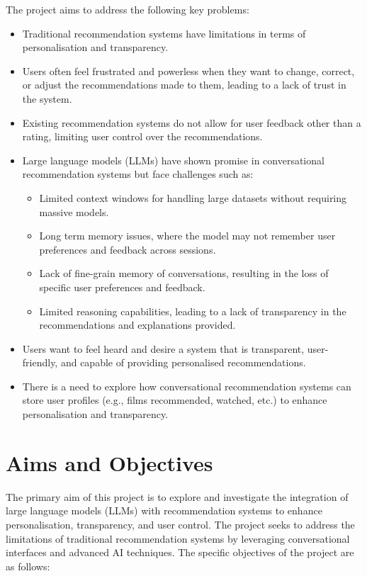 The project aims to address the following key problems:

\begin{itemize}
    \item Traditional recommendation systems have limitations in terms of personalisation and transparency.
    \item Users often feel frustrated and powerless when they want to change, correct, or adjust the recommendations made to them, leading to a lack of trust in the system.
    \item Existing recommendation systems do not allow for user feedback other than a rating, limiting user control over the recommendations.
    \item Large language models (LLMs) have shown promise in conversational recommendation systems but face challenges such as:
    \begin{itemize}
        \item Limited context windows for handling large datasets without requiring massive models.
        \item Long term memory issues, where the model may not remember user preferences and feedback across sessions.
        \item Lack of fine-grain memory of conversations, resulting in the loss of specific user preferences and feedback.
        \item Limited reasoning capabilities, leading to a lack of transparency in the recommendations and explanations provided.
    \end{itemize}
    \item Users want to feel heard and desire a system that is transparent, user-friendly, and capable of providing personalised recommendations.
    \item There is a need to explore how conversational recommendation systems can store user profiles (e.g., films recommended, watched, etc.) to enhance personalisation and transparency.
\end{itemize}

\section{Aims and Objectives}
\label{sec:aims_and_objectives}

The primary aim of this project is to explore and investigate the integration of large language models (LLMs) with recommendation systems to enhance personalisation, transparency, and user control. The project seeks to address the limitations of traditional recommendation systems by leveraging conversational interfaces and advanced AI techniques. The specific objectives of the project are as follows:

